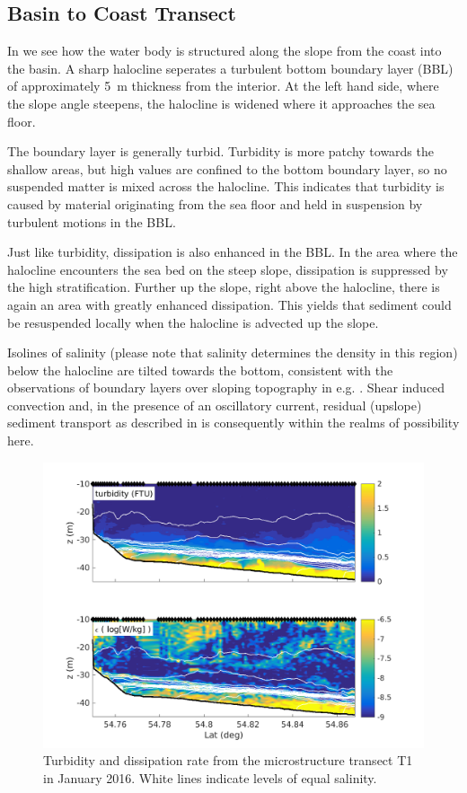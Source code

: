  
\FloatBarrier
\subsection{Basin to Coast Transect}

In  we see how the water body is structured along the slope from 
the coast into the basin. A sharp halocline seperates a turbulent bottom 
boundary layer (BBL) of approximately 5~m thickness from the interior. At the 
left hand side, where the slope angle steepens, the halocline is widened where 
it approaches the sea floor. 

The boundary layer is generally turbid. Turbidity is more patchy towards the 
shallow areas, but high values are confined to the bottom boundary layer, 
so no suspended matter is mixed across the halocline. This indicates that 
turbidity is caused by material originating from the sea floor and held in 
suspension by turbulent motions in the BBL.

Just like turbidity, dissipation is also enhanced in the BBL. In the area where 
the halocline encounters the sea bed on the steep slope, dissipation is 
suppressed by the high stratification. Further up the slope, right above the 
halocline, there is again an area with greatly enhanced dissipation. This 
yields that sediment could be resuspended locally when the halocline is 
advected up the slope.

Isolines of salinity (please note that salinity determines the density in this 
region) below the halocline are tilted towards the bottom, consistent with the 
observations of boundary layers over sloping topography in e.g. 
\cite{Lorkeetal2005a}. Shear induced convection and, in the presence of an 
oscillatory current, residual (upslope) sediment transport as described in 
\cite{schulzumlauf2016} is consequently within the realms of possibility here.

\begin{figure}[ht]
\includegraphics[width=40pc]{bilder/abtrans.png}
 \caption{Turbidity and dissipation rate from the microstructure transect T1 
in January 2016. White lines indicate levels of equal salinity.}
 \label{transect}
 \end{figure}

